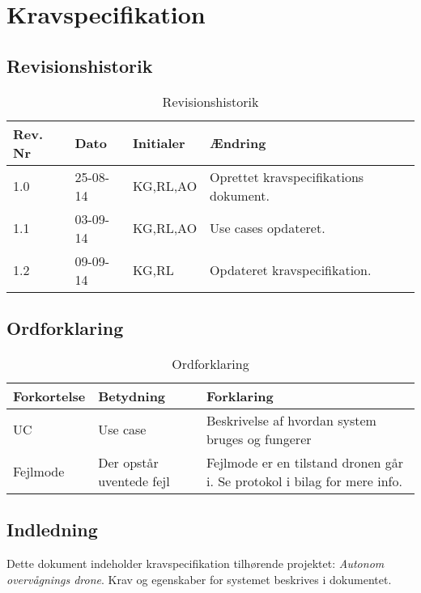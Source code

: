 \chapter{Kravspecifikation}

\section{Revisionshistorik}
\begin{table}[H]
	\centering
		\begin{tabular}{|p{2 cm}|p{2 cm}|p{3 cm}|p{6 cm}|} 
		\hline
			\textbf{Rev. Nr} & \textbf{Dato}		& \textbf{Initialer} 	& \textbf{Ændring} \\ \hline
			1.0 	& 25-08-14	& KG,RL,AO		& Oprettet kravspecifikations dokument.	\\ \hline
			1.1 	& 03-09-14	& KG,RL,AO		& Use cases opdateret.\\ \hline
			1.2 	& 09-09-14	& KG,RL			& Opdateret kravspecifikation.\\ \hline
		\end{tabular}
	\caption{Revisionshistorik}
\end{table}

\vspace{1.5cm}

\section{Ordforklaring}
\begin{table}[H]
	\centering
		\begin{tabular}{|p{2.5cm}|p{4.5 cm}|p{6.5 cm}|} 
		\hline
			\textbf{Forkortelse} & \textbf{Betydning} & \textbf{Forklaring} \\ \hline
			UC & Use case & Beskrivelse af hvordan system bruges og fungerer \\ \hline
			Fejlmode & Der opstår uventede fejl & Fejlmode er en tilstand dronen går i. Se protokol i bilag for mere info. \\ \hline
		\end{tabular}
	\caption{Ordforklaring}
\end{table}

\vspace{2cm}

\section{Indledning}

Dette dokument indeholder kravspecifikation tilhørende projektet: \textit{Autonom overvågnings drone}. Krav og egenskaber for systemet beskrives i dokumentet.